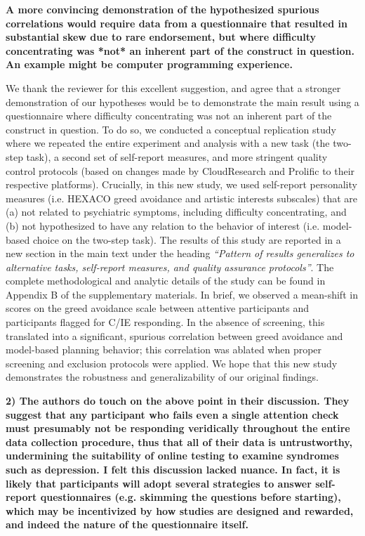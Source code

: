 \documentclass[a4paper,notitlepage,12pt]{article}
\begin{document}
\textbf{A more convincing demonstration of the hypothesized spurious correlations would require data from a questionnaire that resulted in substantial skew due to rare endorsement, but where difficulty concentrating was *not* an inherent part of the construct in question. An example might be computer programming experience.}

We thank the reviewer for this excellent suggestion, and agree that a stronger demonstration of our hypotheses would be to demonstrate the main result using a questionnaire where difficulty concentrating was not an inherent part of the construct in question. To do so, we conducted a conceptual replication study where we repeated the entire experiment and analysis with a new task (the two-step task), a second set of self-report measures, and more stringent quality control protocols (based on changes made by CloudResearch and Prolific to their respective platforms). Crucially, in this new study, we used self-report personality measures (i.e. HEXACO greed avoidance and artistic interests subscales) that are (a) not related to psychiatric symptoms, including difficulty concentrating, and (b) not hypothesized to have any relation to the behavior of interest (i.e. model-based choice on the two-step task). The results of this study are reported in a new section in the main text under the heading \textit{``Pattern of results generalizes to alternative tasks, self-report measures, and quality assurance protocols''}. The complete methodological and analytic details of the study can be found in Appendix B of the supplementary materials. In brief, we observed a mean-shift in scores on the greed avoidance scale between attentive participants and participants flagged for C/IE responding. In the absence of screening, this translated into a significant, spurious correlation between greed avoidance and model-based planning behavior; this correlation was ablated when proper screening and exclusion protocols were applied. We hope that this new study demonstrates the robustness and generalizability of our original findings. 

\textbf{2) The authors do touch on the above point in their discussion. They suggest that any participant who fails even a single attention check must presumably not be responding veridically throughout the entire data collection procedure, thus that all of their data is untrustworthy, undermining the suitability of online testing to examine syndromes such as depression. I felt this discussion lacked nuance. In fact, it is likely that participants will adopt several strategies to answer self-report questionnaires (e.g. skimming the questions before starting), which may be incentivized by how studies are designed and rewarded, and indeed the nature of the questionnaire itself.}
\end{document}
